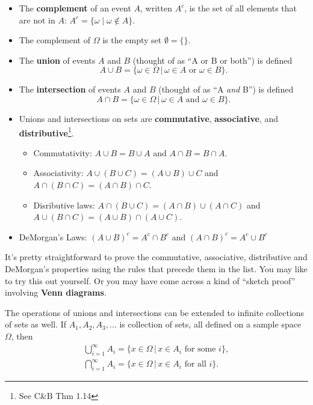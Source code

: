 \documentclass[
]{book}
\theoremstyle{definition}
\theoremstyle{definition}
\theoremstyle{definition}
\theoremstyle{definition}
\theoremstyle{remark}
\begin{document}
\begin{itemize}
\item
  The \textbf{complement} of an event \(A\), written \(A^c\), is the set of all elements that are not in \(A\): \(A^c = \{\omega \mid \omega\not\in A \}\).
\item
  The complement of \(\Omega\) is the empty set \(\emptyset = \{\}\).
\item
  The \textbf{union} of events \(A\) and \(B\) (thought of as ``A or B or both'') is defined
  \[
  A \cup B = \{\omega \in \Omega \,|\, \omega \in A \text{ or } \omega \in B \}.
  \]
\item
  The \textbf{intersection} of events \(A\) and \(B\) (thought of as ``A \emph{and} B'') is defined
  \[
  A \cap B = \{\omega \in \Omega \,|\, \omega \in A \text{ and } \omega \in B \}.
  \]
\item
  Unions and intersections on sets are \textbf{commutative}, \textbf{associative}, and \textbf{distributive}\footnote{See C\&B Thm 1.14}.

  \begin{itemize}
  \item
    Commutativity: \(A \cup B = B \cup A\) and \(A \cap B = B \cap A\).
  \item
    Associativity: \(A \cup (B \cup C) = (A \cup B) \cup C\) and \(A \cap (B \cap C) = (A \cap B) \cap C\).
  \item
    Disributive laws: \(A \cap (B \cup C) = (A \cap B) \cup (A \cap C)\) and \(A \cup (B \cap C) = (A \cup B) \cap (A \cup C)\).
  \end{itemize}
\item
  DeMorgan's Laws: \((A \cup B)^c = A^c \cap B^c\) and \((A \cap B)^c = A^c \cup B^c\)
\end{itemize}

It's pretty straightforward to prove the commutative, associative, distributive and DeMorgan's properties using the rules that precede them in the list. You may like to try this out yourself. Or you may have come across a kind of ``sketch proof'' involving \textbf{Venn diagrams}.

The operations of unions and intersections can be extended to infinite collections of sets as well.
If \(A_1,A_2,A_3,\dots\) is collection of sets, all defined on a sample space \(\Omega\), then
\begin{gather*}
\bigcup_{i=1}^\infty A_i = \{x \in \Omega \,|\, x\in A_i \text{ for some } i \}, \\
\bigcap_{i=1}^\infty A_i = \{x \in \Omega \,|\, x\in A_i \text{ for all } i \}.
\end{gather*}
\end{document}
